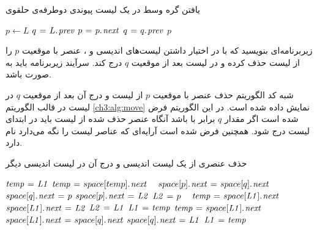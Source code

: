 \begin{algorithm}
\caption{یافتن گره وسط در یک لیست پیوندی دوطرفه‌ی حلقوی}\label{ch3:alg:findMiddle}
\begin{latin}
\begin{algorithmic}[1]
    \State    $p \gets L$
    \State    $q \mathrel{\hspace{1pt}=\hspace{1pt}} L.\hspace*{1pt}\mathit{prev}$
        \State    $p \mathrel{\hspace{1pt}=\hspace{1pt}} p.\hspace*{1pt}\mathit{next}$
        \State    $q \mathrel{\hspace{1pt}=\hspace{1pt}} q.\hspace*{1pt}\mathit{prev}$
    \EndWhile
    \State    \Return $p$
\EndFunction
\end{algorithmic}
\end{latin}
\end{algorithm}


 زیربرنامه‌ای بنویسید که با در اختیار داشتن لیست‌های اندیسی {} و {}، عنصر با موقعیت {$p$} را از لیست {} حذف کرده و در لیست {} بعد از موقعیت {$q$} درج کند. سرآیند زیربرنامه باید به صورت {} باشد.


شبه کد الگوریتم حذف عنصر با موقعیت {$p$} از لیست {} و درج آن بعد از موقعیت {$q$} در لیست {} در قالب الگوریتم {\eqref{ch3:alg:move}} نمایش داده شده است. در این الگوریتم فرض شده است اگر مقدار {$q$} برابر با {} باشد آنگاه عنصر حذف شده از لیست {} باید در ابتدای لیست {} درج شود. همچنین فرض شده است آرایه‌ای که عناصر لیست را نگه می‌دارد {} نام دارد.

\begin{algorithm}
\caption{حذف عنصری از یک لیست اندیسی و درج آن در لیست اندیسی دیگر}\label{ch3:alg:move}
\begin{latin}
\begin{algorithmic}[1]
		\label{ch3:alg:line:mvOutIfBegin}
				\State	$\mathit{temp} \mathrel{\hspace{1pt}=\hspace{1pt}} \mathit{L1}$
				\label{ch3:alg:line:mvWhileBegin}
						\State	$\mathit{temp} \mathrel{\hspace{1pt}=\hspace{1pt}} space[temp].\hspace*{1pt}\mathit{next}$
				\EndWhile\ \label{ch3:alg:line:mvWhileEnd}
				\label{ch3:alg:mvInIf1Begin}
						\State	$space[p].\hspace*{1pt}\mathit{next} \mathrel{\hspace{1pt}=\hspace{1pt}} space[q].\hspace*{1pt}\mathit{next}$
						\State	$space[q].\hspace*{1pt}\mathit{next} \mathrel{\hspace{1pt}=\hspace{1pt}} p$
				\Else
						\State	$space[p].\hspace*{1pt}\mathit{next} \mathrel{\hspace{1pt}=\hspace{1pt}} \mathit{L2}$
						\State	$\mathit{L2} \mathrel{\hspace{1pt}=\hspace{1pt}} p$
				\EndIf\ \label{ch3:alg:line:mvOutIfEnd}
		\Else
				\label{ch3:alg:line:mvOutElseBegin}
						\State	$\mathit{temp} \mathrel{\hspace{1pt}=\hspace{1pt}} space[\mathit{L1}].\hspace*{1pt}\mathit{next}$
						\State	$space[\mathit{L1}].\hspace*{1pt}\mathit{next} \mathrel{\hspace{1pt}=\hspace{1pt}} \mathit{L2}$
						\State	$\mathit{L2} \mathrel{\hspace{1pt}=\hspace{1pt}} \mathit{L1}$
						\State	$\mathit{L1} \mathrel{\hspace{1pt}=\hspace{1pt}} \mathit{temp}$
				\Else
						\State	$\mathit{temp} \mathrel{\hspace{1pt}=\hspace{1pt}} space[\mathit{L1}].\hspace*{1pt}\mathit{next}$
						\State	$space[\mathit{L1}].\hspace*{1pt}\mathit{next} \mathrel{\hspace{1pt}=\hspace{1pt}} space[q].\hspace*{1pt}\mathit{next}$
						\State	$space[q].\hspace*{1pt}\mathit{next} \mathrel{\hspace{1pt}=\hspace{1pt}} \mathit{L1}$
						\State	$\mathit{L1} \mathrel{\hspace{1pt}=\hspace{1pt}} \mathit{temp}$
				\EndIf
		\EndIf\ \label{ch3:alg:line:mvOutElseEnd}
\EndProcedure
\end{algorithmic}
\end{latin}
\end{algorithm}

